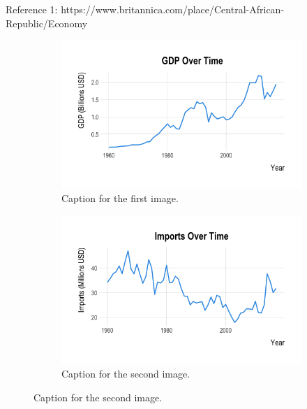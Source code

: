 \documentclass[11pt]{article}
\begin{document}
Reference 1: https://www.britannica.com/place/Central-African-Republic/Economy

\begin{figure}[htbp]
  \centering
  \begin{subfigure}[b]{0.48\textwidth}
    \centering
    \includegraphics[width=\linewidth]{EDA/GDP_over_Time.png} %
    \caption{Caption for the first image.}
    \label{fig:side:a}
  \end{subfigure}
  \hfill
  \begin{subfigure}[b]{0.48\textwidth}
    \centering
    \includegraphics[width=\linewidth]{EDA/Imports_over_Time.png} %
    \caption{Caption for the second image.}
    \label{fig:side:b}
  \end{subfigure}

  \label{fig:side-by-side}


\end{figure}
\end{document}
